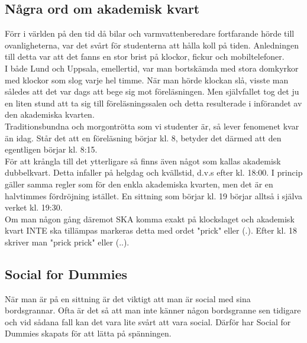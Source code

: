 \newpage

\subsection*{Några ord om akademisk kvart}

Förr i världen på den tid då bilar och varmvattenberedare
fortfarande hörde till ovanligheterna, var det svårt för studenterna 
att hålla koll på tiden. Anledningen till detta var att det fanns en
stor brist på klockor, fickur och mobiltelefoner.
\\

I både Lund och Uppsala, emellertid, var man bortskämda 
med stora domkyrkor med klockor som slog varje hel timme.
När man hörde klockan slå, visste man således att det var
dags att bege sig mot föreläsningen. Men självfallet tog det
ju en liten stund att ta sig till föreläsningssalen och detta
resulterade i införandet av den akademiska kvarten.
\\

Traditionsbundna och morgontrötta som vi studenter
är, så lever fenomenet kvar än idag. Står det att en
föreläsning börjar kl. 8, betyder det därmed att den
egentligen börjar kl. 8:15.
\\

För att krångla till det ytterligare så finns även något 
som kallas akademisk dubbelkvart. Detta infaller på
helgdag och kvällstid, d.v.s efter kl. 18:00. I princip 
gäller samma regler som för den enkla akademiska kvarten,
men det är en halvtimmes fördröjning istället. En sittning
som börjar kl. 19 börjar alltså i själva verket kl. 19:30.
\\

Om man någon gång däremot SKA komma
exakt på klockslaget och akademisk kvart
INTE ska tillämpas markeras detta med ordet "prick" eller (.).
Efter kl. 18 skriver man "prick prick" eller (..).
\\

\newpage


\subsection*{Social for Dummies}
När man är på en sittning är det viktigt att man är social med sina bordsgrannar. 
Ofta är det så att man inte känner någon bordsgranne sen tidigare och vid sådana 
fall kan det vara lite svårt att vara social. Därför har Social for Dummies 
skapats för att lätta på spänningen.
\\

